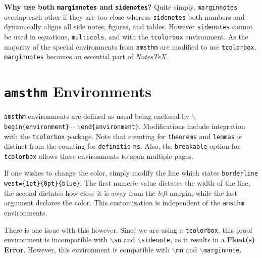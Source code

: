 \documentclass[10pt]{article}
\begin{document}
	\begin{remark}\textbf{Why use both \texttt{marginnotes} and \texttt{sidenotes}?}
		Quite simply, \texttt{marginnotes} overlap each other if they are too close whereas \texttt{sidenotes} both numbers and dynamically aligns all side notes, figures, and tables. However \texttt{sidenotes} cannot be used in equations, \texttt{multicols}, and with the \texttt{tcolorbox} environment. As the majority of the special environments from \texttt{amsthm} are modified to use \texttt{tcolorbox}, \texttt{marginnotes} becomes an essential part of \textit{NotesTeX}.
	\end{remark}
	

	\section{\texttt{amsthm} Environments}\label{Sub:Special}
	\texttt{amsthm} environments are defined as usual being enclosed by \texttt{$\backslash$begin\{environment\}}$\cdots$ \texttt{$\backslash$end\{environment\}}. Modifications include integration with the \texttt{tcolorbox} package. Note that counting for \texttt{theorems} and \texttt{lemmas} is distinct from the counting for \texttt{definitio} \texttt{ns}. Also, the \texttt{breakable} option for \texttt{tcolorbox} allows these environments to span multiple pages.

	If one wishes to change the color, simply modify the line which states \texttt{borderline west=\{1pt\}}\texttt{\{0pt\}\{blue\}}. The first numeric value dictates the width of the line, the second dictates how close it is away from the \textit{left} margin, while the last argument declares the color. This customization is independent of the \texttt{amsthm} environments.

	There is one issue with this however. Since we are using a \texttt{tcolorbox}, this proof environment is incompatible with \texttt{$\backslash$sn} and \texttt{$\backslash$sidenote}, as it results in a \textbf{Float(s) Error}. However, this environment is compatible with \texttt{$\backslash$mn} and \texttt{$\backslash$marginnote}.
\end{document}

